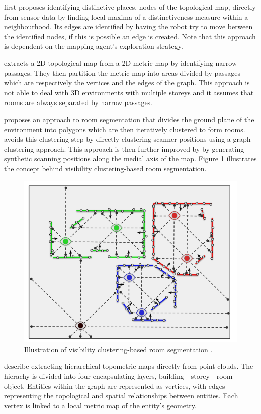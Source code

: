 \citet{kuipers_robot_1991} first proposes identifying distinctive places, nodes of the topological map, directly from sensor data by finding local maxima of a distinctiveness measure within a neighbourhood. Its edges are identified by having the robot try to move between the identified nodes, if this is possible an edge is created. Note that this approach is dependent on the mapping agent's exploration strategy. 

\citet{thrun_learning_1998} extracts a 2D topological map from a 2D metric map by identifying narrow passages. They then partition the metric map into areas divided by passages which are respectively the vertices and the edges of the graph. This approach is not able to deal with 3D environments with multiple storeys and it assumes that rooms are always separated by narrow passages.

\citet{mura_automatic_2014} proposes an approach to room segmentation that divides the ground plane of the environment into polygons which are then iteratively clustered to form rooms. \citet{mura_piecewise-planar_2016} avoids this clustering step by directly clustering scanner positions using a graph clustering approach. This approach is then further improved by \citet{ambrus_automatic_2017} by generating synthetic scanning positions along the medial axis of the map. Figure \ref{fig:vis_cluster} illustrates the concept behind visibility clustering-based room segmentation.

\begin{figure}[h]
    \centering
    \includegraphics*[width=.7\textwidth]{./fig/visibility_clustering.png}
    \caption{Illustration of visibility clustering-based room segmentation \citep{pintore_state---art_2020}.}
    \label{fig:vis_cluster}
\end{figure}

\citet{ochmann_towards_2014} describe extracting hierarchical topometric maps directly from point clouds. The hierachy is divided into four encapsulating layers, building - storey - room - object. Entities within the graph are represented as vertices, with edges representing the topological and spatial relationships between entities. Each vertex is linked to a local metric map of the entity's geometry. 

